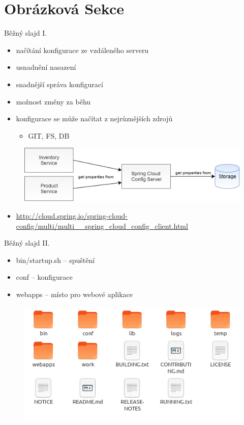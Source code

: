 \documentclass{beamer}							%
\begin{document}
\section{Obrázková Sekce}
\begin{frame}{Běžný slajd I.}
	\begin{itemize}
		\item načítání konfigurace ze vzdáleného serveru
		\item usnadnění nasazení
		\item snadnější správa konfigurací
		\item možnost změny za běhu
		\item konfigurace se může načítat z nejrůznějších zdrojů
		      \begin{itemize}
			      \item GIT, FS, DB
		      \end{itemize}
	\end{itemize}
	\begin{figure}[htp]
		\includegraphics[width=\linewidth]{images/config.png}
	\end{figure}
	\begin{itemize}
		\item \url{http://cloud.spring.io/spring-cloud-config/multi/multi__spring_cloud_config_client.html}
	\end{itemize}
\end{frame}
\begin{frame}{Běžný slajd II.}
	\begin{itemize}
		\item bin/startup.sh -- spuštění
		\item conf -- konfigurace
		\item webapps -- místo pro webové aplikace
	\end{itemize}
	\begin{figure}[htp]
		\includegraphics[width=\linewidth]{images/tomcat-webapps.png}
	\end{figure}
\end{frame}
\end{document}
